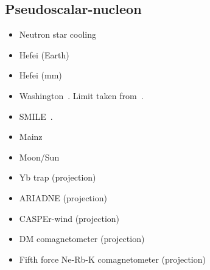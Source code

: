 \documentclass[8pt,twocolumn]{extarticle}
\begin{document}
\begin{mdframed}
\subsection*{Pseudoscalar-nucleon}\vspace{-0.5em}
\begin{itemize}\setlength\itemsep{-0.5em}
	\item Neutron star cooling~\cite{Buschmann:2021juv}
	\item Hefei (Earth)~\cite{Zhang:2023qmu}
	\item Hefei (mm)~\cite{Feng:2022tsu}
    \item Washington~\cite{Venema:1992zz}. Limit taken from~\cite{Safronova:2017xyt}.
    \item SMILE~\cite{Lee:2018vaq}.
    \item Mainz~\cite{Tullney:2013wqa}
    \item Moon/Sun~\cite{Wu:2023vkx}
    \item Yb trap (projection)~\cite{Agrawal:2023lmw}
    \item ARIADNE (projection)~\cite{Arvanitaki:2014dfa}
    \item CASPEr-wind (projection)~\cite{JacksonKimball:2017elr}
    \item DM comagnetometer (projection)~\cite{Bloch:2019lcy}
    \item Fifth force Ne-Rb-K comagnetometer (projection)~\cite{Wei:2022ggs}
\end{itemize}
\end{mdframed}

\newpage
\end{document}

